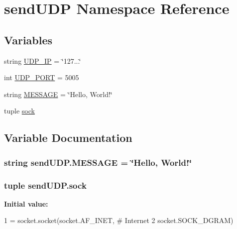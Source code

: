 \hypertarget{namespacesendUDP}{}\section{send\+U\+D\+P Namespace Reference}
\label{namespacesendUDP}
\subsection*{Variables}
\begin{DoxyCompactItemize}
\item 
string \hyperlink{namespacesendUDP_a51b8da19fc2ba1a4cbfc9711483430d5}{U\+D\+P\+\_\+\+I\+P} = \char`\"{}127...\char`\"{}
\item 
int \hyperlink{namespacesendUDP_abc1722f41699039c028eff6051422d9f}{U\+D\+P\+\_\+\+P\+O\+R\+T} = 5005
\item 
string \hyperlink{namespacesendUDP_a0c110c792a80af2a5f6772a9ae92c540}{M\+E\+S\+S\+A\+G\+E} = \char`\"{}Hello, World!\char`\"{}
\item 
tuple \hyperlink{namespacesendUDP_a89183ad85baed424508f175ee5f268a8}{sock}
\end{DoxyCompactItemize}


\subsection{Variable Documentation}
\hypertarget{namespacesendUDP_a0c110c792a80af2a5f6772a9ae92c540}{}
\subsubsection[{M\+E\+S\+S\+A\+G\+E}]{\setlength{\rightskip}{0pt plus 5cm}string send\+U\+D\+P.\+M\+E\+S\+S\+A\+G\+E = \char`\"{}Hello, World!\char`\"{}}\label{namespacesendUDP_a0c110c792a80af2a5f6772a9ae92c540}
\hypertarget{namespacesendUDP_a89183ad85baed424508f175ee5f268a8}{}
\subsubsection[{sock}]{\setlength{\rightskip}{0pt plus 5cm}tuple send\+U\+D\+P.\+sock}\label{namespacesendUDP_a89183ad85baed424508f175ee5f268a8}
{\bfseries Initial value\+:}
\begin{DoxyCode}
1 = socket.socket(socket.AF\_INET, \textcolor{comment}{# Internet}
2                      socket.SOCK\_DGRAM)
\end{DoxyCode}
\hypertarget{namespacesendUDP_a51b8da19fc2ba1a4cbfc9711483430d5}{}
